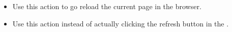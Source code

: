 
\begin{itemize}
\item Use this action to go reload the current page in the browser.
\item Use this action instead of actually clicking the refresh button in the \gdaut{}. 
\end{itemize}
